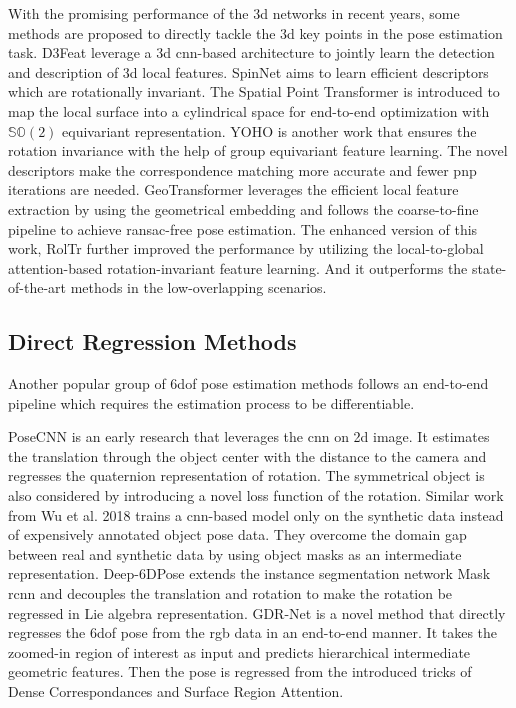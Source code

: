 \documentclass[12pt,DIV14,BCOR12mm,a4paper,footinclude=false,headinclude,parskip=half-,twoside,openright,cleardoublepage=empty,toc=index,bibliography=totoc,listof=totoc]{scrreprt}
\numberwithin{equation}{chapter}
\begin{document}
With the promising performance of the \gls{3d} networks \cite{qi2017pointnet,qi2017pointnet++} in recent years, some methods are proposed to directly tackle the \gls{3d} key points in the pose estimation task. D3Feat \cite{bai2020d3feat} leverage a \gls{3d} \gls{cnn}-based architecture to jointly learn the detection and description of \gls{3d} local features. SpinNet \cite{ao2021spinnet} aims to learn efficient descriptors which are rotationally invariant. The Spatial Point Transformer is introduced to map the local surface into a cylindrical space for end-to-end optimization with $\mathbb{SO}(2)$ equivariant representation. YOHO \cite{wang2022hypothesize} is another work that ensures the rotation invariance with the help of group equivariant feature learning. The novel descriptors make the correspondence matching more accurate and fewer \gls{pnp} iterations are needed. GeoTransformer \cite{qin2022geometric} leverages the efficient local feature extraction by using the geometrical embedding and follows the coarse-to-fine pipeline to achieve \gls{ransac}-free pose estimation. The enhanced version of this work, RolTr \cite{yu2023rotationinvariant} further improved the performance by utilizing the local-to-global attention-based rotation-invariant feature learning. And it outperforms the state-of-the-art methods in the low-overlapping scenarios.


\subsection{Direct Regression Methods}
Another popular group of \gls{6dof} pose estimation methods follows an end-to-end pipeline which requires the estimation process to be differentiable.

PoseCNN \cite{xiang2018posecnn} is an early research that leverages the \gls{cnn} on \gls{2d} image. It estimates the translation through the object center with the distance to the camera and regresses the quaternion representation of rotation. The symmetrical object is also considered by introducing a novel loss function of the rotation. Similar work from Wu et al. 2018 \cite{Wu_2018} trains a \gls{cnn}-based model only on the synthetic data instead of expensively annotated object pose data. They overcome the domain gap between real and synthetic data by using object masks as an intermediate representation. Deep-6DPose \cite{do2018deep6dpose} extends the instance segmentation network Mask \gls{rcnn} \cite{he2018mask} and decouples the translation and rotation to make the rotation be regressed in Lie algebra representation. GDR-Net \cite{wang2021gdrnet} is a novel method that directly regresses the \gls{6dof} pose from the \gls{rgb} data in an end-to-end manner. It takes the zoomed-in region of interest as input and predicts hierarchical intermediate geometric features. Then the pose is regressed from the introduced tricks of Dense Correspondances and Surface Region Attention.
\end{document}
